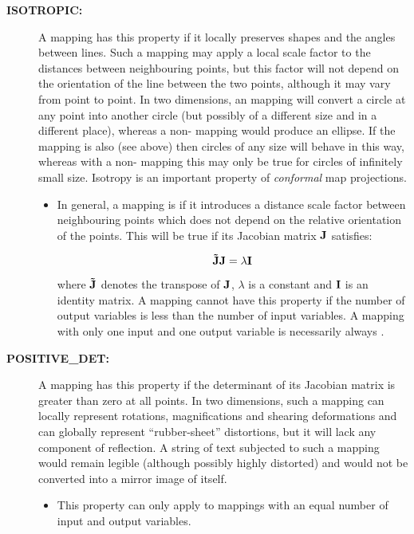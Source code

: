 \begin{description}
\item[{\bf ISOTROPIC:}] A mapping has this property if it locally preserves
shapes and the angles between lines. 
Such a mapping may apply a local scale factor to the distances between
neighbouring points, but this factor will not depend on the orientation
of the line between the two points, although it may vary from point to
point. 
In two dimensions, an  mapping will convert a circle at any
point into another circle (but possibly of a different size and in a
different place), whereas a non- mapping would produce an
ellipse. 
If the mapping is also  (see above) then circles of
any size will behave in this way, whereas with a non-
mapping this may only be true for circles of infinitely small size. 
Isotropy is an important property of {\em conformal} map projections. 

\begin{itemize}
\item In general, a mapping is  if it introduces a distance
scale factor between neighbouring points which does not depend on the
relative orientation of the points. 
This will be true if its Jacobian matrix ${\bf J}$ satisfies: 

\begin{equation}
{\bf \tilde{J}} {\bf J} = \lambda {\bf I }
\end{equation}

where ${\bf \tilde{J}}$ denotes the transpose of ${\bf J}$, $\lambda$ is a
constant and ${\bf I}$ is an identity matrix. 
A mapping cannot have this property if the number of output variables is
less than the number of input variables. 
A mapping with only one input and one output variable is necessarily always
. 

\end{itemize}

\item[{\bf POSITIVE\_DET:}] A mapping has this property if the determinant
of its Jacobian matrix is greater than zero at all points. 
In two dimensions, such a mapping can locally represent rotations,
magnifications and shearing deformations and can globally represent
``rubber-sheet'' distortions, but it will lack any component of reflection. 
A string of text subjected to such a mapping would remain legible (although
possibly highly distorted) and would not be converted into a mirror image of
itself. 

\begin{itemize}
\item This property can only apply to mappings with an equal number of input
and output variables. 
\end{itemize}


\end{description}
